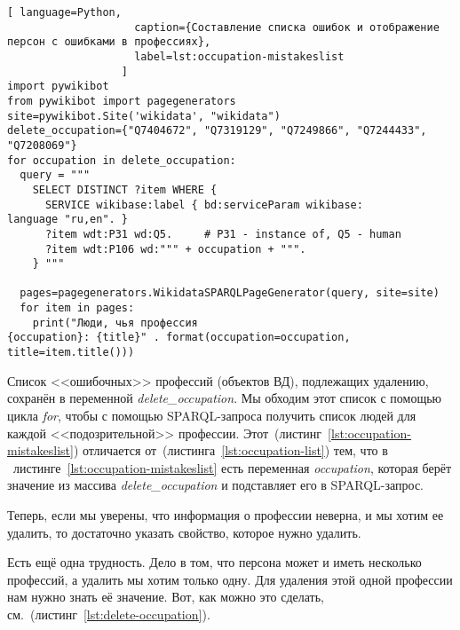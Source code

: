 \begin{lstlisting}[ language=Python,
                    caption={Составление списка ошибок и отображение персон с ошибками в профессиях},
                    label=lst:occupation-mistakeslist
                  ]
import pywikibot
from pywikibot import pagegenerators
site=pywikibot.Site('wikidata', "wikidata")
delete_occupation={"Q7404672", "Q7319129", "Q7249866", "Q7244433", 
"Q7208069"}
for occupation in delete_occupation:
  query = """
    SELECT DISTINCT ?item WHERE {
      SERVICE wikibase:label { bd:serviceParam wikibase:
language "ru,en". }
      ?item wdt:P31 wd:Q5.     # P31 - instance of, Q5 - human
      ?item wdt:P106 wd:""" + occupation + """.
    } """

  pages=pagegenerators.WikidataSPARQLPageGenerator(query, site=site)
  for item in pages:
    print("Люди, чья профессия 
{occupation}: {title}" . format(occupation=occupation, 
title=item.title()))
\end{lstlisting} 

Список <<ошибочных>> профессий (объектов ВД), подлежащих удалению, сохранён в переменной 
\textit{delete\_occupation}. 
Мы обходим этот список с помощью цикла \textit{for}, 
чтобы с помощью SPARQL-запроса получить список людей для каждой <<подозрительной>> профессии. 
Этот~(листинг~\ref{lst:occupation-mistakeslist}) отличается от~(листинга~\ref{lst:occupation-list}) тем, 
что в ~листинге~\ref{lst:occupation-mistakeslist} есть переменная \textit{occupation}, 
которая берёт значение из массива \textit{delete\_occupation} и подставляет его в SPARQL-запрос.

Теперь, если мы уверены, что информация о профессии неверна, и мы хотим ее удалить, то достаточно указать свойство, которое нужно удалить.

Есть ещё одна трудность. Дело в том, что персона может и иметь несколько профессий, а удалить мы хотим только одну. 
Для удаления этой одной профессии нам нужно знать её значение. 
Вот, как можно это сделать, см.~(листинг~\ref{lst:delete-occupation}). 


